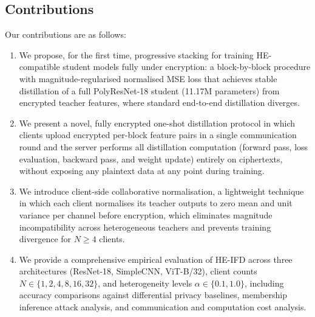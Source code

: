 

\subsection{Contributions}
Our contributions are as follows:

\begin{enumerate}
\item We propose, for the first time, progressive stacking for training HE-compatible student models fully under encryption: a block-by-block procedure with magnitude-regularised normalised MSE loss that achieves stable distillation of a full PolyResNet-18 student (11.17M parameters) from encrypted teacher features, where standard end-to-end distillation diverges.

\item We present a novel, fully encrypted one-shot distillation protocol in which clients upload encrypted per-block feature pairs in a single communication round and the server performs all distillation computation (forward pass, loss evaluation, backward pass, and weight update) entirely on ciphertexts, without exposing any plaintext data at any point during training.

\item We introduce client-side collaborative normalisation, a lightweight technique in which each client normalises its teacher outputs to zero mean and unit variance per channel before encryption, which eliminates magnitude incompatibility across heterogeneous teachers and prevents training divergence for $N \geq 4$ clients.

\item We provide a comprehensive empirical evaluation of HE-IFD across three architectures (ResNet-18, SimpleCNN, ViT-B/32), client counts $N \in \{1, 2, 4, 8, 16, 32\}$, and heterogeneity levels $\alpha \in \{0.1, 1.0\}$, including accuracy comparisons against differential privacy baselines, membership inference attack analysis, and communication and computation cost analysis.
\end{enumerate}

